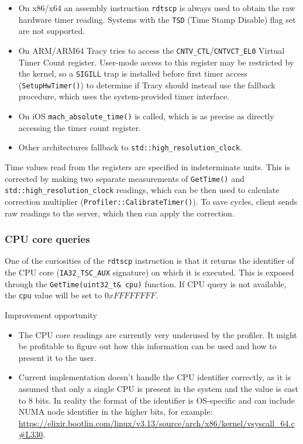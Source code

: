 \documentclass[hidelinks,titlepage,a4paper]{article}
\begin{document}
\begin{itemize}
\item On x86/x64 an assembly instruction \texttt{rdtscp} is always used to obtain the raw hardware timer reading. Systems with the \texttt{TSD} (Time Stamp Disable) flag set are not supported.
\item On ARM/ARM64 Tracy tries to access the \texttt{CNTV\_CTL}/\texttt{CNTVCT\_EL0} Virtual Timer Count register. User-mode access to this register may be restricted by the kernel, so a \texttt{SIGILL} trap is installed before first timer access (\texttt{SetupHwTimer()}) to determine if Tracy should instead use the fallback procedure, which uses the system-provided timer interface.
\item On iOS \texttt{mach\_absolute\_time()} is called, which is as precise as directly accessing the timer count register.
\item Other architectures fallback to \texttt{std::high\_resolution\_clock}.
\end{itemize}

Time values read from the registers are specified in indeterminate units. This is corrected by making two separate measurements of \texttt{GetTime()} and \texttt{std::high\_resolution\_clock} readings, which can be then used to calculate correction multiplier (\texttt{Profiler::CalibrateTimer()}). To save cycles, client sends raw readings to the server, which then can apply the correction.

\subsubsection{CPU core queries}

One of the curiosities of the \texttt{rdtscp} instruction is that it returns the identifier of the CPU core (\texttt{IA32\_TSC\_AUX} signature) on which it is executed. This is exposed through the \texttt{GetTime(uint32\_t\& cpu)} function. If CPU query is not available, the \texttt{cpu} value will be set to $0xFFFFFFFF$.

\begin{bclogo}[
noborder=true,
couleur=black!5,
logo=\bclampe
]{Improvement opportunity}
\begin{itemize}
\item The CPU core readings are currently very underused by the profiler. It might be profitable to figure out how this information can be used and how to present it to the user.
\item Current implementation doesn't handle the CPU identifier correctly, as it is assumed that only a single CPU is present in the system and the value is cast to 8 bits. In reality the format of the identifier is OS-specific and can include NUMA node identifier in the higher bits, for example: \url{https://elixir.bootlin.com/linux/v3.13/source/arch/x86/kernel/vsyscall_64.c#L330}.
\end{itemize}
\end{bclogo}
\end{document}
